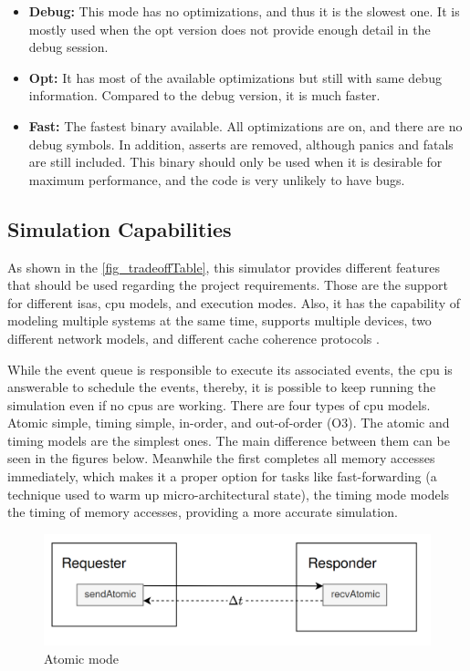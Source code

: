 \begin{itemize}
    \item \textbf{Debug:} This mode has no optimizations, and thus it is the slowest one. It is mostly used when the opt version does not provide enough detail in the debug session. 

    \item \textbf{Opt:} It has most of the available optimizations but still with same debug information. Compared to the debug version, it is much faster.

    \item \textbf{Fast:} The fastest binary available. All optimizations are on, and there are no debug symbols. In addition, asserts are removed, although panics and fatals are still included. This binary should only be used when it is desirable for maximum performance, and the code is very unlikely to have bugs.
\end{itemize}

\subsection{Simulation Capabilities}
\label{subsec::SimCap}

As shown in the \autoref{fig_tradeoffTable}, this simulator provides different features that should be used regarding the project requirements. Those are the support for different \glspl{isa}, \gls{cpu} models, and execution modes. Also, it has the capability of modeling multiple systems at the same time, supports multiple devices, two different network models, and different cache coherence protocols \cite{TheGem5Simulator}.

While the event queue is responsible to execute its associated events, the \gls{cpu} is answerable to schedule the events, thereby, it is possible to keep running the simulation even if no \glspl{cpu} are working. There are four types of \gls{cpu} models. Atomic simple, timing simple, in-order, and out-of-order (O3). The atomic and timing models are the simplest ones. The main difference between them can be seen in the figures below. Meanwhile the first completes all memory accesses immediately, which makes it a proper option for tasks like fast-forwarding (a technique used to warm up micro-architectural state), the timing mode models the timing of memory accesses, providing a more accurate simulation.

\begin{figure}[H]
	\centering
 	\includegraphics[width=0.7\linewidth]{Images/AtomicMode.png}
 	\caption{Atomic mode}
	 \label{fig_AtomicMode}
\end{figure}

